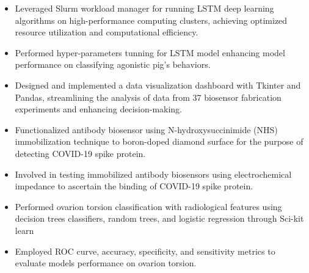 \documentclass[12pt,a4paper,sans]{moderncv} %
\begin{document}
{
    \begin{itemize}
        \item Leveraged Slurm workload manager for running LSTM deep learning algorithms on high-performance computing clusters, achieving optimized resource utilization and computational efficiency. 
        \item Performed hyper-parameters tunning for LSTM model enhancing model performance on classifying agonistic pig's behaviors.
    \end{itemize}
}

{
    \begin{itemize}
        \item Designed and implemented a data visualization dashboard with Tkinter and Pandas, streamlining the analysis of data from 37 biosensor fabrication experiments and enhancing decision-making.
        \item Functionalized antibody biosensor using N-hydroxysuccinimide (NHS) immobilization technique to boron-doped diamond surface for the purpose of detecting COVID-19 spike protein.
        \item Involved in testing immobilized antibody biosensors using electrochemical impedance to ascertain the binding of COVID-19 spike protein.
    \end{itemize}
}

{
    \begin{itemize}
        \item Performed ovarion torsion classification with radiological features using decision trees classifiers, random trees, and logistic regression through Sci-kit learn
        \item Employed ROC curve, accuracy, specificity, and sensitivity metrics to evaluate models performance on ovarion torsion.
    \end{itemize}
}
\end{document}
